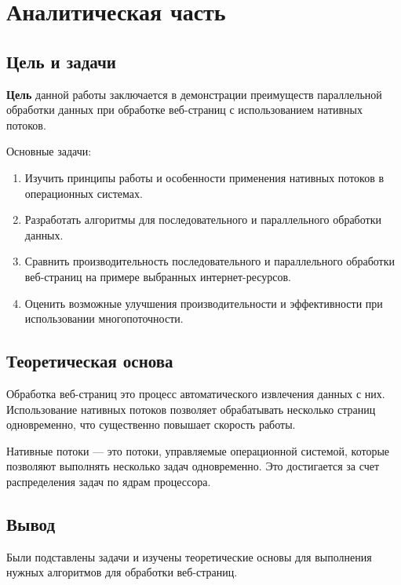 \chapter{Аналитическая часть}

\section{Цель и задачи}
\textbf{Цель} данной работы заключается в демонстрации преимуществ параллельной обработки данных при обработке веб-страниц с использованием нативных потоков.

Основные задачи:
\begin{enumerate}
	\item Изучить принципы работы и особенности применения нативных потоков в операционных системах.
	\item Разработать алгоритмы для последовательного и параллельного обработки данных.
	\item Сравнить производительность последовательного и параллельного обработки веб-страниц на примере выбранных интернет-ресурсов.
	\item Оценить возможные улучшения производительности и эффективности при использовании многопоточности.
\end{enumerate}

\section{Теоретическая основа}
Обработка веб-страниц это процесс автоматического извлечения данных с них. Использование нативных потоков позволяет обрабатывать несколько страниц одновременно, что существенно повышает скорость работы.

Нативные потоки — это потоки, управляемые операционной системой, которые позволяют выполнять несколько задач одновременно. Это достигается за счет распределения задач по ядрам процессора.

\section{Вывод}
Были подставлены задачи и изучены теоретические основы для выполнения нужных алгоритмов для обработки веб-страниц.
